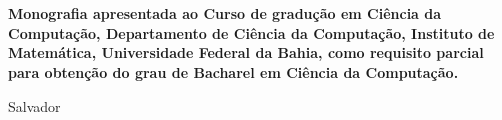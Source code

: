 

\begin{titlepage}
 \vfill
 \begin{center}
   {\large \uppercase{ \bf{ \meunome\ } } } \\[7cm]
   {\Huge \uppercase{ \bf{ \meutitulo\ } } }\\[1cm]
   \vfill
   \hspace{.45\textwidth} %
   \begin{minipage}{.5\textwidth}
     \begin{espacosimples}
       \bf{
	Monografia apresentada ao Curso de gradução em Ciência da Computação, 
	Departamento de Ciência da Computação, Instituto de Matemática, Universidade Federal da 
	Bahia, como requisito parcial para obtenção do grau de Bacharel em Ciência da Computação. \\ 
       }      
     \end{espacosimples}
     \begin{espacosimples}    
       \meuorientador
       \newline
       \meucoorientador
     \end{espacosimples}
   \end{minipage}
   \vfill
   Salvador \\
   \meuano
 \end{center}
\end{titlepage}
